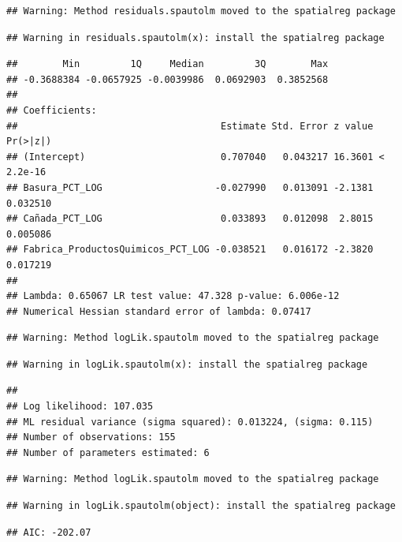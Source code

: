 \documentclass[11pt,]{article}
\begin{document}
\begin{verbatim}
## Warning: Method residuals.spautolm moved to the spatialreg package
\end{verbatim}

\begin{verbatim}
## Warning in residuals.spautolm(x): install the spatialreg package
\end{verbatim}

\begin{verbatim}
##        Min         1Q     Median         3Q        Max 
## -0.3688384 -0.0657925 -0.0039986  0.0692903  0.3852568 
## 
## Coefficients: 
##                                    Estimate Std. Error z value  Pr(>|z|)
## (Intercept)                        0.707040   0.043217 16.3601 < 2.2e-16
## Basura_PCT_LOG                    -0.027990   0.013091 -2.1381  0.032510
## Cañada_PCT_LOG                     0.033893   0.012098  2.8015  0.005086
## Fabrica_ProductosQuimicos_PCT_LOG -0.038521   0.016172 -2.3820  0.017219
## 
## Lambda: 0.65067 LR test value: 47.328 p-value: 6.006e-12 
## Numerical Hessian standard error of lambda: 0.07417
\end{verbatim}

\begin{verbatim}
## Warning: Method logLik.spautolm moved to the spatialreg package
\end{verbatim}

\begin{verbatim}
## Warning in logLik.spautolm(x): install the spatialreg package
\end{verbatim}

\begin{verbatim}
## 
## Log likelihood: 107.035 
## ML residual variance (sigma squared): 0.013224, (sigma: 0.115)
## Number of observations: 155 
## Number of parameters estimated: 6
\end{verbatim}

\begin{verbatim}
## Warning: Method logLik.spautolm moved to the spatialreg package
\end{verbatim}

\begin{verbatim}
## Warning in logLik.spautolm(object): install the spatialreg package
\end{verbatim}

\begin{verbatim}
## AIC: -202.07
\end{verbatim}
\end{document}
